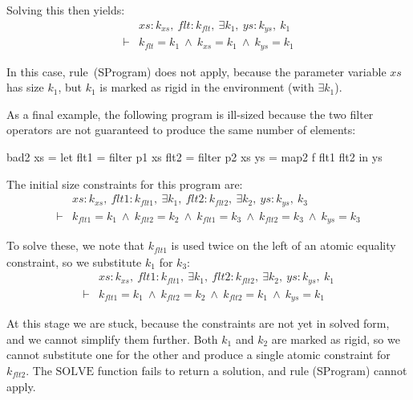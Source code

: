 \noindent
Solving this then yields:
$$
\begin{array}{ll}
       & xs : k_{xs},~ flt : k_{flt},~ \exists k_1,~ ys : k_{ys},~ k_1
\\
\vdash &          k_{flt}  = k_1
        ~\wedge~  k_{xs}   = k_1
        ~\wedge~  k_{ys}   = k_1
\end{array}
$$

In this case, rule~(SProgram) does not apply, because the parameter variable $xs$ has size $k_1$, but $k_1$ is marked as rigid in the environment (with $\exists k_1$). 

As a final example, the following program is ill-sized because the two filter operators are not guaranteed to produce the same number of elements:
\begin{haskell}
bad2 xs
 = let flt1 = filter p1 xs
       flt2 = filter p2 xs
       ys   = map2   f  flt1 flt2
   in  ys
\end{haskell}

The initial size constraints for this program are:
\newcommand\flt{\textit{flt}}
$$
\begin{array}{ll}
       & xs : k_{xs},~ \flt1 : k_{\flt1},~ \exists k_1,~ \flt2 : k_{\flt2},~ \exists k_2,~ ys : k_{ys},~ k_3
\\
\vdash &          k_{\flt1}   = k_1
        ~\wedge~  k_{\flt2}   = k_2
        ~\wedge~  k_{\flt1}   = k_3
        ~\wedge~  k_{\flt2}   = k_3
        ~\wedge~  k_{ys}   = k_3
\end{array}
$$

To solve these, we note that $k_{\flt1}$ is used twice on the left of an atomic equality constraint, so we substitute $k_1$ for $k_3$:
$$
\begin{array}{ll}
       & xs : k_{xs},~ \flt1 : k_{\flt1},~ \exists k_1,~ \flt2 : k_{\flt2},~ \exists k_2,~ ys : k_{ys},~ k_1
\\
\vdash &          k_{\flt1}   = k_1
        ~\wedge~  k_{\flt2}   = k_2
        ~\wedge~  k_{\flt2}   = k_1
        ~\wedge~  k_{ys}   = k_1
\end{array}
$$

At this stage we are stuck, because the constraints are not yet in solved form, and we cannot simplify them further.
Both $k_1$ and $k_2$ are marked as rigid, so we cannot substitute one for the other and produce a single atomic constraint for $k_{\flt2}$.
The $\textrm{SOLVE}$ function fails to return a solution, and rule (SProgram) cannot apply.


% 

